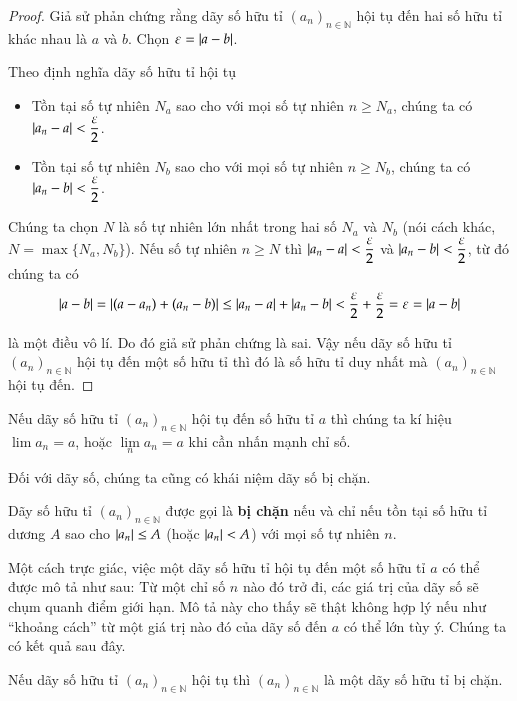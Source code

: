 \begin{proof}
    Giả sử phản chứng rằng dãy số hữu tỉ ${(a_{n})}_{n\in\mathbb{N}}$ hội tụ đến hai số hữu tỉ khác nhau là $a$ và $b$. Chọn $\varepsilon = \left\vert{a - b}\right\vert$.

    Theo định nghĩa dãy số hữu tỉ hội tụ
    \begin{itemize}[topsep=0pt]
        \item Tồn tại số tự nhiên $N_{a}$ sao cho với mọi số tự nhiên $n\geq N_{a}$, chúng ta có $\left\vert{a_{n} - a}\right\vert < \dfrac{\varepsilon}{2}$.
        \item Tồn tại số tự nhiên $N_{b}$ sao cho với mọi số tự nhiên $n\geq N_{b}$, chúng ta có $\left\vert{a_{n} - b}\right\vert < \dfrac{\varepsilon}{2}$.
    \end{itemize}

    Chúng ta chọn $N$ là số tự nhiên lớn nhất trong hai số $N_{a}$ và $N_{b}$ (nói cách khác, $N = \max\{ N_{a}, N_{b} \}$). Nếu số tự nhiên $n\geq N$ thì $\left\vert{a_{n} - a}\right\vert < \dfrac{\varepsilon}{2}$ và $\left\vert{a_{n} - b}\right\vert < \dfrac{\varepsilon}{2}$, từ đó chúng ta có
    \[
        \left\vert{a - b}\right\vert = \left\vert{(a - a_{n}) + (a_{n} - b)}\right\vert \leq \left\vert{a_{n} - a}\right\vert + \left\vert{a_{n} - b}\right\vert < \frac{\varepsilon}{2} + \frac{\varepsilon}{2} = \varepsilon = \left\vert{a - b}\right\vert
    \]

    là một điều vô lí. Do đó giả sử phản chứng là sai. Vậy nếu dãy số hữu tỉ ${(a_{n})}_{n\in\mathbb{N}}$ hội tụ đến một số hữu tỉ thì đó là số hữu tỉ duy nhất mà ${(a_{n})}_{n\in\mathbb{N}}$ hội tụ đến.
\end{proof}

Nếu dãy số hữu tỉ ${(a_{n})}_{n\in\mathbb{N}}$ hội tụ đến số hữu tỉ $a$ thì chúng ta kí hiệu $\lim a_{n} = a$, hoặc $\lim\limits_{n} a_{n} = a$ khi cần nhấn mạnh chỉ số.

Đối với dãy số, chúng ta cũng có khái niệm dãy số bị chặn.
\begin{definition}
    Dãy số hữu tỉ ${(a_{n})}_{n\in\mathbb{N}}$ được gọi là \textbf{bị chặn} nếu và chỉ nếu tồn tại số hữu tỉ dương $A$ sao cho $\left\vert{a_{n}}\right\vert\leq A$ (hoặc $\left\vert{a_{n}}\right\vert < A$) với mọi số tự nhiên $n$.
\end{definition}

Một cách trực giác, việc một dãy số hữu tỉ hội tụ đến một số hữu tỉ $a$ có thể được mô tả như sau: Từ một chỉ số $n$ nào đó trở đi, các giá trị của dãy số sẽ chụm quanh điểm giới hạn. Mô tả này cho thấy sẽ thật không hợp lý nếu như ``khoảng cách'' từ một giá trị nào đó của dãy số đến $a$ có thể lớn tùy ý. Chúng ta có kết quả sau đây.
\begin{theorem}\label{theorem:convergence-sequences-are-bounded}
    Nếu dãy số hữu tỉ ${(a_{n})}_{n\in\mathbb{N}}$ hội tụ thì ${(a_{n})}_{n\in\mathbb{N}}$ là một dãy số hữu tỉ bị chặn.
\end{theorem}


